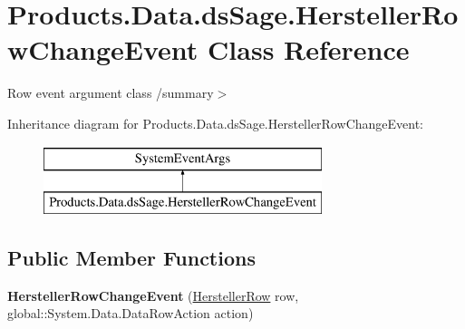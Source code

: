 \hypertarget{class_products_1_1_data_1_1ds_sage_1_1_hersteller_row_change_event}{}\section{Products.\+Data.\+ds\+Sage.\+Hersteller\+Row\+Change\+Event Class Reference}
\label{class_products_1_1_data_1_1ds_sage_1_1_hersteller_row_change_event}


Row event argument class /summary$>$  


Inheritance diagram for Products.\+Data.\+ds\+Sage.\+Hersteller\+Row\+Change\+Event\+:\begin{figure}[H]
\begin{center}
\leavevmode
\includegraphics[height=2.000000cm]{class_products_1_1_data_1_1ds_sage_1_1_hersteller_row_change_event}
\end{center}
\end{figure}
\subsection*{Public Member Functions}
\begin{DoxyCompactItemize}
\item 
{\bfseries Hersteller\+Row\+Change\+Event} (\hyperlink{class_products_1_1_data_1_1ds_sage_1_1_hersteller_row}{Hersteller\+Row} row, global\+::\+System.\+Data.\+Data\+Row\+Action action)\hypertarget{class_products_1_1_data_1_1ds_sage_1_1_hersteller_row_change_event_a8b6aed01d9b9eca41751c9ee3d60e965}{}\label{class_products_1_1_data_1_1ds_sage_1_1_hersteller_row_change_event_a8b6aed01d9b9eca41751c9ee3d60e965}

\end{DoxyCompactItemize}
